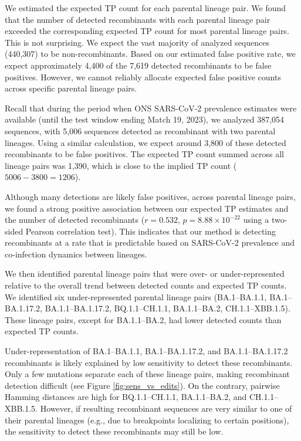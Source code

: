 \documentclass[11pt,oneside,letterpaper]{article}
\begin{document}
We estimated the expected TP count for each parental lineage pair. We found that the number of detected recombinants with each parental lineage pair exceeded the corresponding expected TP count for most parental lineage pairs. This is not surprising. We expect the vast majority of analyzed sequences (440,307) to be non-recombinants. Based on our estimated false positive rate, we expect approximately 4,400 of the 7,619 detected recombinants to be false positives. However, we cannot reliably allocate expected false positive counts across specific parental lineage pairs.

Recall that during the period when ONS SARS-CoV-2 prevalence estimates were available (until the test window ending Match 19, 2023), we analyzed 387,054 sequences, with 5,006 sequences detected as recombinant with two parental lineages. Using a similar calculation, we expect around 3,800 of these detected recombinants to be false positives. The expected TP count summed across all lineage pairs was 1,390, which is close to the implied TP count ($5006 - 3800 = 1206$). 

Although many detections are likely false positives, across parental lineage pairs, we found a strong positive association between our expected TP estimates and the number of detected recombinants ($r = 0.532$, $p = 8.88\times 10^{-22}$ using a two-sided Pearson correlation test). This indicates that our method is detecting recombinants at a rate that is predictable based on SARS-CoV-2 prevalence and co-infection dynamics between lineages. 

We then identified parental lineage pairs that were over- or under-represented relative to the overall trend between detected counts and expected TP counts. We identified six under-represented parental lineage pairs (BA.1--BA.1.1, BA.1--BA.1.17.2, BA.1.1--BA.1.17.2, BQ.1.1--CH.1.1, BA.1.1--BA.2, CH.1.1--XBB.1.5). These lineage pairs, except for BA.1.1--BA.2, had lower detected counts than expected TP counts. 

Under-representation of BA.1--BA.1.1, BA.1--BA.1.17.2, and BA.1.1--BA.1.17.2 recombinants is likely explained by low sensitivity to detect these recombinants. Only a few mutations separate each of these lineage pairs, making recombinant detection difficult (see Figure \ref{fig:sens_vs_edits}). On the contrary, pairwise Hamming distances are high for BQ.1.1--CH.1.1, BA.1.1--BA.2, and CH.1.1--XBB.1.5. However, if resulting recombinant sequences are very similar to one of their parental lineages (e.g., due to breakpoints localizing to certain positions), the sensitivity to detect these recombinants may still be low. 
\end{document}
